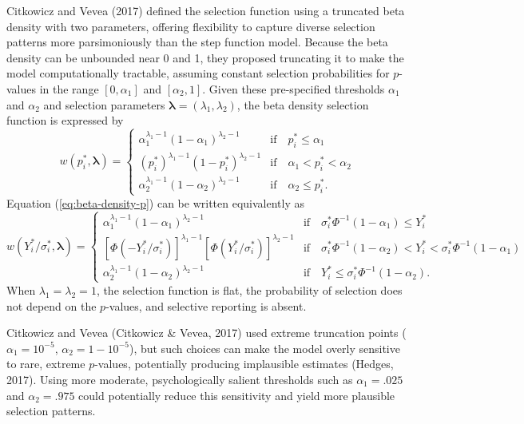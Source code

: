 \documentclass[
  man, donotrepeattitle,floatsintext]{apa7}
\begin{document}
Citkowicz and Vevea (2017) defined the selection function using a truncated beta density with two parameters, offering flexibility to capture diverse selection patterns more parsimoniously than the step function model. Because the beta density can be unbounded near 0 and 1, they proposed truncating it to make the model computationally tractable, assuming constant selection probabilities for \(p\)-values in the range \([0, \alpha_1]\) and \([\alpha_2, 1]\). Given these pre-specified thresholds \(\alpha_1\) and \(\alpha_2\) and selection parameters \(\boldsymbol\lambda = (\lambda_1, \lambda_2)\), the beta density selection function is expressed by
\begin{equation}
\label{eq:beta-density-p}
w(p^*_i, \boldsymbol\lambda) =  \begin{cases} 
\alpha_1^{\lambda_1 - 1} (1 - \alpha_1)^{\lambda_2 - 1} & \text{if} \quad p^*_i \leq \alpha_1 \\
\left(p^*_i\right)^{\lambda_1 - 1} (1 - p^*_i)^{\lambda_2 - 1} & \text{if} \quad \alpha_1 < p^*_i < \alpha_2 \\
\alpha_2^{\lambda_1 - 1} (1 - \alpha_2)^{\lambda_2 - 1} & \text{if} \quad \alpha_2 \leq p^*_i.
\end{cases}
\end{equation}
Equation (\ref{eq:beta-density-p}) can be written equivalently as
\begin{equation}
\label{eq:beta-density-y}
w(Y^*_i / \sigma^*_i, \boldsymbol\lambda) =  \begin{cases} 
\alpha_1^{\lambda_1 - 1} (1 - \alpha_1)^{\lambda_2 - 1} & \text{if} \quad \sigma^*_i \Phi^{-1}(1 - \alpha_1) \leq Y^*_i \\
\left[\Phi\left(-Y^*_i / \sigma^*_i\right)\right]^{\lambda_1 - 1} \left[\Phi\left(Y^*_i / \sigma^*_i\right)\right]^{\lambda_2 - 1} & \text{if} \quad \sigma^*_i \Phi^{-1}(1 - \alpha_2) < Y^*_i < \sigma^*_i \Phi^{-1}(1 - \alpha_1) \\
\alpha_2^{\lambda_1 - 1} (1 - \alpha_2)^{\lambda_2 - 1} & \text{if} \quad  Y^*_i \leq \sigma^*_i \Phi^{-1}(1 - \alpha_2).
\end{cases}
\end{equation}
When \(\lambda_1 = \lambda_2 = 1\), the selection function is flat, the probability of selection does not depend on the \(p\)-values, and selective reporting is absent.

Citkowicz and Vevea (Citkowicz \& Vevea, 2017) used extreme truncation points (\(\alpha_1 = 10^{-5}\), \(\alpha_2 = 1 - 10^{-5}\)), but such choices can make the model overly sensitive to rare, extreme \(p\)-values, potentially producing implausible estimates (Hedges, 2017). Using more moderate, psychologically salient thresholds such as \(\alpha_1 = .025\) and \(\alpha_2 = .975\) could potentially reduce this sensitivity and yield more plausible selection patterns.
\end{document}
